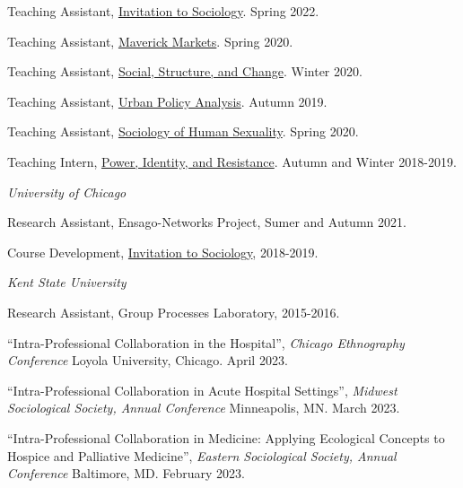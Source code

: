 \documentclass[11pt,article,oneside]{memoir}
\begin{document}
\ind Teaching Assistant, \underline{Invitation to Sociology}. Spring 2022.

\ind Teaching Assistant, \underline{Maverick Markets}. Spring 2020.

\ind Teaching Assistant, \underline{Social, Structure, and Change}. Winter 2020.

\ind Teaching Assistant, \underline{Urban Policy Analysis}. Autumn 2019.

\ind Teaching Assistant, \underline{Sociology of Human Sexuality}. Spring 2020.

\ind Teaching Intern, \underline{Power, Identity, and Resistance}. Autumn and Winter 2018-2019.

\bigskip

\medskip
\noindent\emph{University of Chicago \vspace{0.01in}}

\ind Research Assistant, Ensago-Networks Project, Sumer and Autumn 2021. \vspace{0.05in}

\ind Course Development, \underline{Invitation to Sociology}, 2018-2019. \vspace{0.05in}

\smallskip
\noindent\emph{Kent State University \vspace{0.01in}}

\ind Research Assistant, Group Processes Laboratory, 2015-2016. \vspace{0.1in}

\normalsize

\bigskip

\medskip

\ind ``Intra-Professional Collaboration in the Hospital'', \emph{Chicago Ethnography Conference} Loyola University, Chicago. April 2023. \vspace{0.05in}

\ind ``Intra-Professional Collaboration in Acute Hospital Settings'', \emph{Midwest Sociological Society, Annual Conference} Minneapolis, MN. March 2023. \vspace{0.05in}

\ind ``Intra-Professional Collaboration in Medicine: Applying Ecological Concepts to Hospice and Palliative Medicine'', \emph{Eastern Sociological Society, Annual Conference} Baltimore, MD. February 2023. \vspace{0.05in} 
\end{document}
